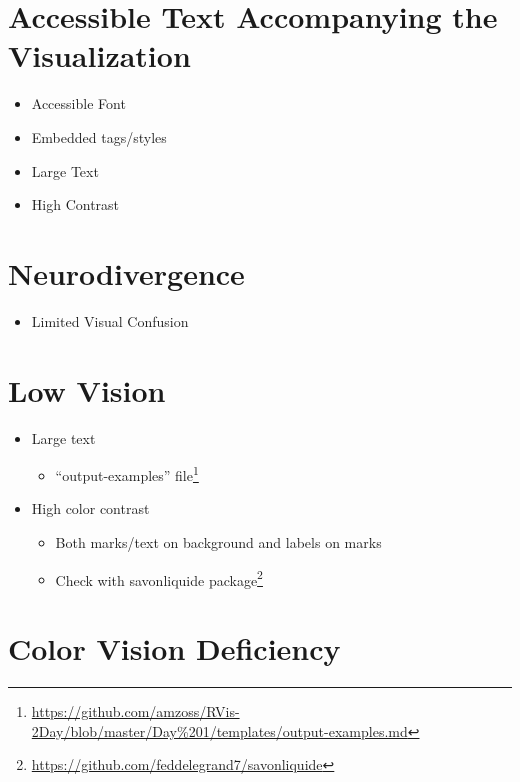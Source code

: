\documentclass[
]{krantz}
\providecommand{\tightlist}{%
  \setlength{\itemsep}{0pt}\setlength{\parskip}{0pt}}
\renewcommand{\href}[2]{#2\footnote{\url{#1}}}
\begin{document}
\hypertarget{accessible-text-accompanying-the-visualization}{%
\section{Accessible Text Accompanying the Visualization}\label{accessible-text-accompanying-the-visualization}}

\begin{itemize}
\tightlist
\item
  Accessible Font
\item
  Embedded tags/styles
\item
  Large Text
\item
  High Contrast
\end{itemize}

\hypertarget{neurodivergence}{%
\section{Neurodivergence}\label{neurodivergence}}

\begin{itemize}
\tightlist
\item
  Limited Visual Confusion
\end{itemize}

\hypertarget{low-vision}{%
\section{Low Vision}\label{low-vision}}

\begin{itemize}
\item
  Large text

  \begin{itemize}
  \tightlist
  \item
    \href{https://github.com/amzoss/RVis-2Day/blob/master/Day\%201/templates/output-examples.md}{``output-examples'' file}
  \end{itemize}
\item
  High color contrast

  \begin{itemize}
  \item
    Both marks/text on background and labels on marks
  \item
    Check with \href{https://github.com/feddelegrand7/savonliquide}{savonliquide package}
  \end{itemize}
\end{itemize}

\hypertarget{color-vision-deficiency}{%
\section{Color Vision Deficiency}\label{color-vision-deficiency}}
\end{document}
